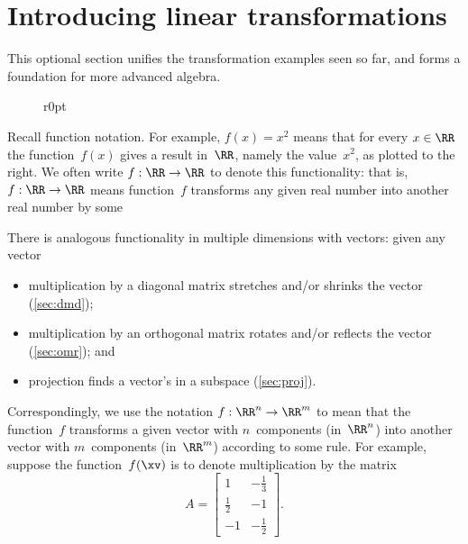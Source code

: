 

\section{Introducing linear transformations}
\label{sec:ilt}
\secttoc
\begin{comment}
\pooliv{\S3.6} \layiv{\S1.8--9} \holti{\S3.1}
\end{comment}


This optional section unifies the transformation examples seen so far, and forms a foundation for more advanced algebra. 

\begin{wrapfigure}r{0pt}
\end{wrapfigure}
Recall function notation.
For example, \(f(x)=x^2\) means that for every \(x\in\RR\) the function~\(f(x)\) gives a result in~\(\RR\), namely the value~\(x^2\), as plotted to the right.  
We often write \(f:\RR\to\RR\) to denote this functionality: that is, \(f:\RR\to\RR\) means function~\(f\) transforms any given real number into another real number by some 

There is analogous functionality in multiple dimensions with vectors: given any vector 
\begin{itemize}
\item multiplication by a diagonal matrix stretches and/or shrinks the vector (\cref{sec:dmd});
\item multiplication by an orthogonal matrix rotates and/or reflects the vector (\cref{sec:omr});
and \item projection finds a vector's  in a subspace (\cref{sec:proj}).
\end{itemize}
Correspondingly, we use the notation \(f:\RR^n\to\RR^m\) to mean that the function~\(f\) transforms a given vector with \(n\)~components (in~\(\RR^n\)) into another vector with \(m\)~components (in~\(\RR^m\)) according to some rule. 
For example, suppose the function~\(f(\xv)\) is to denote multiplication by the matrix
\begin{equation*}
A=\begin{bmatrix} 1&-\frac13\\\frac12&-1\\-1&-\frac12 \end{bmatrix}.
\end{equation*}

